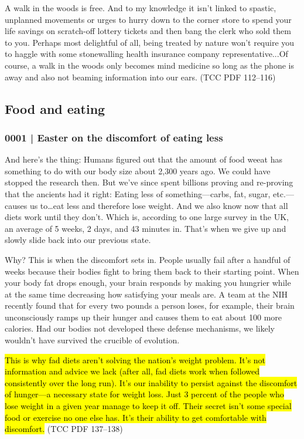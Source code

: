 			A walk in the woods is free. And to my knowledge it isn't linked to spastic, unplanned movements or urges to hurry down to the corner store to spend your life savings on scratch-off lottery tickets and then bang the clerk who sold them to you. Perhaps most delightful of all, being treated by nature won't require you to haggle with some stonewalling health insurance company representative...Of course, a walk in the woods only becomes mind medicine so long as the phone is away and also not beaming information into our ears. (TCC PDF 112--116)
			
	\subsection{Food and eating} %
		\label{GM-LIFE-FOOD}
		
		\subsubsection{0001 | Easter on the discomfort of eating less}
			\label{GM-LIFE-FOOD-0001}
			
			And here's the thing: Humans figured out that the amount of food weeat has something to do with our body size about 2,300 years ago. We could have stopped the research then. But we've since spent billions proving and re-proving that the ancients had it right: Eating less of something---carbs, fat, sugar, etc.---causes us to…eat less and therefore lose weight. And we also know now that all diets work until they don't. Which is, according to one large survey in the UK, an average of 5 weeks, 2 days, and 43 minutes in. That's when we give up and slowly slide back into our previous state.

			Why? This is when the discomfort sets in. People usually fail after a handful of weeks because their bodies fight to bring them back to their starting point. When your body fat drops enough, your brain responds by making you hungrier while at the same time decreasing how satisfying your meals are. A team at the NIH recently found that for every two pounds a person loses, for example, their brain unconsciously ramps up their hunger and causes them to eat about 100 more calories. Had our bodies not developed these defense mechanisms, we likely wouldn't have survived the crucible of evolution.

			\hl{This is why fad diets aren't solving the nation's weight problem. It's not information and advice we lack (after all, fad diets work when followed consistently over the long run). It's our inability to persist against the discomfort of hunger---a necessary state for weight loss. Just 3 percent of the people who lose weight in a given year manage to keep it off. Their secret isn't some special food or exercise no one else has. It's their ability to get comfortable with discomfort.} (TCC PDF 137--138)
			
